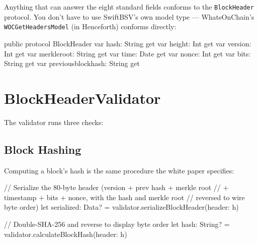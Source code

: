 \documentclass[a4paper, 11pt, openany]{book}
\begin{document}
Anything that can answer the eight standard fields conforms to the \texttt{BlockHeader} protocol. You don't have to use SwiftBSV's own model type --- WhatsOnChain's \texttt{WOCGetHeadersModel} (in Henceforth) conforms directly:

\begin{forthbox}
public protocol BlockHeader {
    var hash: String { get }
    var height: Int { get }
    var version: Int { get }
    var merkleroot: String { get }
    var time: Date { get }
    var nonce: Int { get }
    var bits: String { get }
    var previousblockhash: String { get }
}
\end{forthbox}

\section{BlockHeaderValidator}

The validator runs three checks:


\subsection{Block Hashing}

Computing a block's hash is the same procedure the white paper specifies:

\begin{forthbox}
// Serialize the 80-byte header (version + prev hash + merkle root
// + timestamp + bits + nonce, with the hash and merkle root
// reversed to wire byte order)
let serialized: Data? = validator.serializeBlockHeader(header: h)

// Double-SHA-256 and reverse to display byte order
let hash: String? = validator.calculateBlockHash(header: h)
\end{forthbox}
\end{document}
